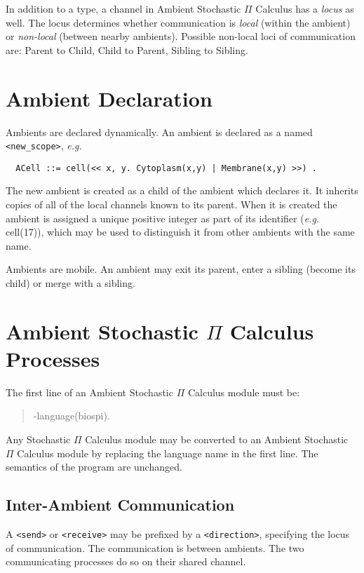 In addition to a type, a channel in Ambient Stochastic $\Pi$ Calculus
has a {\em locus} as well.  The
locus determines whether communication is {\em local} (within the ambient)
or {\em non-local} (between nearby ambients).  Possible non-local loci of
communication are: Parent to Child, Child to Parent, Sibling to
Sibling.

\section{Ambient Declaration}

Ambients are declared dynamically.
An ambient is declared as a named \verb+<new_scope>+, {\em e.g.}

\begin{verbatim}
  ACell ::= cell(<< x, y. Cytoplasm(x,y) | Membrane(x,y) >>) .
\end{verbatim}

The new ambient is created as a child of the ambient which declares it.
It inherits copies of all of the local channels known to its parent.
When it is created the ambient is assigned a unique positive integer
as part of its identifier ({\em e.g.} cell(17)), which may be used
to distinguish it from other ambients with the same name.

Ambients are mobile. An ambient may
exit its parent, enter a sibling (become its child) or merge with a
sibling.

\section{Ambient Stochastic $\Pi$ Calculus Processes}

The first line of an Ambient Stochastic $\Pi$ Calculus module must be:

\begin{verse}
   -language(biospi).
\end{verse}

\noindent
Any Stochastic $\Pi$ Calculus module may be converted to an
Ambient Stochastic $\Pi$ Calculus module by
replacing the language name in the first line.  The semantics
of the program are unchanged.

\subsection{Inter-Ambient Communication}

A \verb+<send>+ or \verb+<receive>+ may be prefixed by a
\verb+<direction>+, specifying the locus of communication.
The communication is between ambients.  The two communicating
processes do so on their shared channel.

